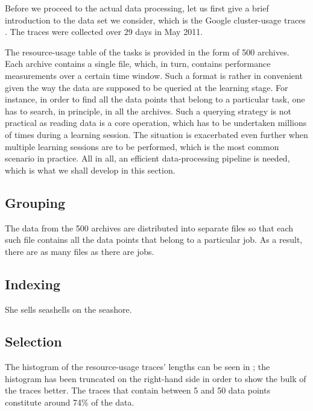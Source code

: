Before we proceed to the actual data processing, let us first give a brief
introduction to the data set we consider, which is the Google cluster-usage
traces \cite{reiss2011}. The traces were collected over 29 days in May 2011.

The resource-usage table of the tasks is provided in the form of 500 archives.
Each archive contains a single  file, which, in turn, contains
performance measurements over a certain time window. Such a format is rather in
convenient given the way the data are supposed to be queried at the learning
stage. For instance, in order to find all the data points that belong to a
particular task, one has to search, in principle, in all the archives. Such a
querying strategy is not practical as reading data is a core operation, which
has to be undertaken millions of times during a learning session. The situation
is exacerbated even further when multiple learning sessions are to be performed,
which is the most common scenario in practice. All in all, an efficient
data-processing pipeline is needed, which is what we shall develop in this
section.

\subsection{Grouping}
The  data from the 500 archives are distributed into separate 
files so that each such file contains all the data points that belong to a
particular job. As a result, there are as many  files as there are jobs.

\subsection{Indexing}
She sells seashells on the seashore.

\subsection{Selection}

The histogram of the resource-usage traces' lengths can be seen in
; the histogram has been truncated on the right-hand side in
order to show the bulk of the traces better. The traces that contain between 5
and 50 data points constitute around 74\% of the data.
